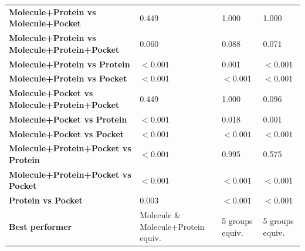 \begin{table}[H]
{\begin{tabular}{llll}
        \textbf{Molecule+Protein vs Molecule+Pocket} & 0.449 & 1.000 & 1.000 \\
        \textbf{Molecule+Protein vs Molecule+Protein+Pocket} & 0.060 & 0.088 & 0.071 \\
        \textbf{Molecule+Protein vs Protein} & $< 0.001$ & 0.001 & $< 0.001$ \\
        \textbf{Molecule+Protein vs Pocket} & $< 0.001$ & $< 0.001$ & $< 0.001$ \\
        \textbf{Molecule+Pocket vs Molecule+Protein+Pocket} & 0.449 & 1.000 & 0.096 \\
        \textbf{Molecule+Pocket vs Protein} & $< 0.001$ & 0.018 & 0.001 \\
        \textbf{Molecule+Pocket vs Pocket} & $< 0.001$ & $< 0.001$ & $< 0.001$ \\
        \textbf{Molecule+Protein+Pocket vs Protein} & $< 0.001$ & 0.995 & 0.575 \\
        \textbf{Molecule+Protein+Pocket vs Pocket} & $< 0.001$ & $< 0.001$ & $< 0.001$ \\
        \textbf{Protein vs Pocket} & 0.003 & $< 0.001$ & $< 0.001$ \\
        \textbf{Best performer} & Molecule \& Molecule+Protein equiv. & 5 groups equiv. & 5 groups equiv. \\
        \bottomrule
    \end{tabular}}
\end{table}